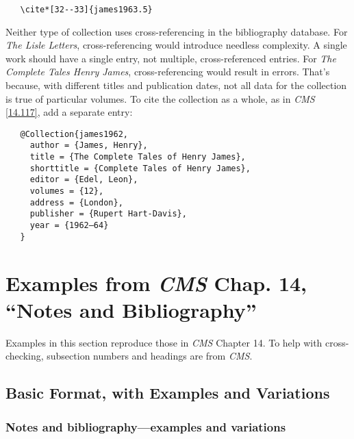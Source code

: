 \documentclass[11pt,letterpaper,oneside]{article}
\begin{document}
\begin{verbatim}
   \cite*[32--33]{james1963.5}
\end{verbatim}

Neither type of collection uses cross-referencing in the bibliography
database. For \textit{The Lisle Letters}, cross-referencing would
introduce needless complexity. A single work should have a single
entry, not multiple, cross-referenced entries. For \textit{The
Complete Tales Henry James}, cross-referencing would result in errors.
That's because, with different titles and publication dates, not all
data for the collection is true of particular volumes. To cite the
collection as a whole, as in \textit{CMS} \ref{14.117}, add a separate
entry:

\begin{verbatim}
   @Collection{james1962,
     author = {James, Henry},
     title = {The Complete Tales of Henry James},
     shorttitle = {Complete Tales of Henry James},
     editor = {Edel, Leon},
     volumes = {12},
     address = {London},
     publisher = {Rupert Hart-Davis},
     year = {1962–64}
   }
\end{verbatim}

\section{Examples from \emph{CMS} Chap. 14, ``Notes and
Bibliography''}
\label{notes}

Examples in this section reproduce those in \textit{CMS} Chapter 14.
To help with cross-checking, subsection numbers and headings are from
\textit{CMS}.

\subsection{Basic Format, with Examples and Variations}
\setcounter{subsection}{14}

\setcounter{subsubsection}{22}
\subsubsection{Notes and bibliography—examples and variations}
\label{14.23}
\end{document}
